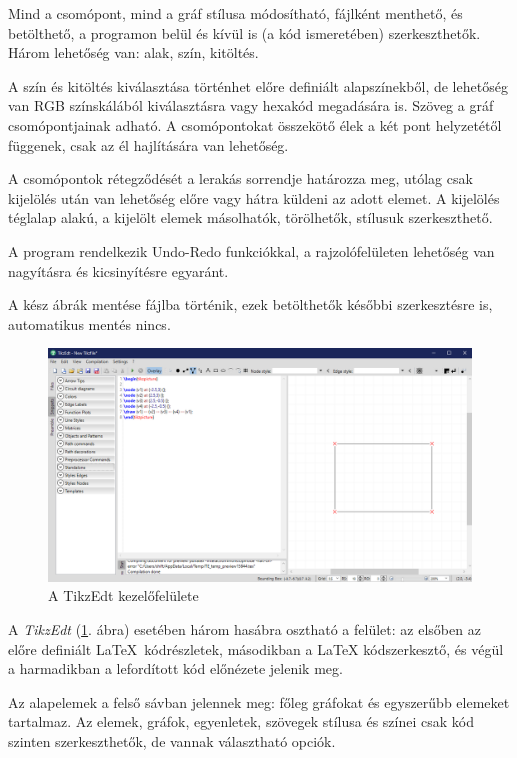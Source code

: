 Mind a csomópont, mind a gráf stílusa módosítható, fájlként menthető, és betölthető, a programon belül és kívül is (a kód ismeretében) szerkeszthetők. Három lehetőség van: alak, szín, kitöltés. 

A szín és kitöltés kiválasztása történhet előre definiált alapszínekből, de lehetőség van RGB színskálából kiválasztásra vagy hexakód megadására is. Szöveg a gráf csomópontjainak adható. A csomópontokat összekötő élek a két pont helyzetétől függenek, csak az él hajlítására van lehetőség. 

A csomópontok rétegződését a lerakás sorrendje határozza meg, utólag csak kijelölés után van lehetőség előre vagy hátra küldeni az adott elemet. A kijelölés téglalap alakú, a kijelölt elemek másolhatók, törölhetők, stílusuk szerkeszthető.  

A program rendelkezik Undo-Redo funkciókkal, a rajzolófelületen lehetőség van nagyításra és kicsinyítésre egyaránt. 

A kész ábrák mentése fájlba történik, ezek betölthetők későbbi szerkesztésre is, automatikus mentés nincs.


\begin{figure}[!h]
	\includegraphics[width=\textwidth]{images/tikzedt.png}
	\caption{A TikzEdt kezelőfelülete \cite{tikzedt}}
\label{fig:tikzedt}
\end{figure}

A \textit{TikzEdt} (\ref{fig:tikzedt}. ábra) esetében három hasábra osztható a felület: az elsőben az előre definiált \LaTeX\ kódrészletek, másodikban a LaTeX kódszerkesztő, és végül a harmadikban a lefordított kód előnézete jelenik meg. 

Az alapelemek a felső sávban jelennek meg: főleg gráfokat és egyszerűbb elemeket tartalmaz. Az elemek, gráfok, egyenletek, szövegek stílusa és színei csak kód szinten szerkeszthetők, de vannak választható opciók. 

